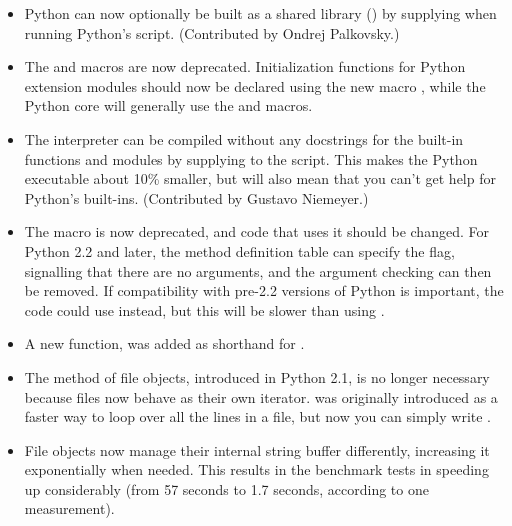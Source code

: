 \documentclass{howto}
\begin{document}
\begin{itemize}
\item Python can now optionally be built as a shared library
() by supplying 
when running Python's  script.  (Contributed by Ondrej
Palkovsky.)

\item The  and  macros
are now deprecated.  Initialization functions for Python extension
modules should now be declared using the new macro
, while the Python core will generally
use the  and 
macros.

\item The interpreter can be compiled without any docstrings for
the built-in functions and modules by supplying
 to the  script.
This makes the Python executable about 10\% smaller, but will also
mean that you can't get help for Python's built-ins.  (Contributed by
Gustavo Niemeyer.)

\item The  macro is now deprecated, and code
that uses it should be changed.  For Python 2.2 and later, the method
definition table can specify the
 flag, signalling that there are no arguments, and
the argument checking can then be removed.  If compatibility with
pre-2.2 versions of Python is important, the code could use
 instead, but this will be slower
than using .

\item A new function,  was added
as shorthand for
.

\item The  method of file objects, introduced in
Python 2.1, is no longer necessary because files now behave as their
own iterator.   was originally introduced as a
faster way to loop over all the lines in a file, but now you can
simply write .

\item File objects now manage their internal string buffer
differently, increasing it exponentially when needed.  This results in
the benchmark tests in  speeding up
considerably (from 57 seconds to 1.7 seconds, according to one
measurement).


\end{itemize}
\end{document}
